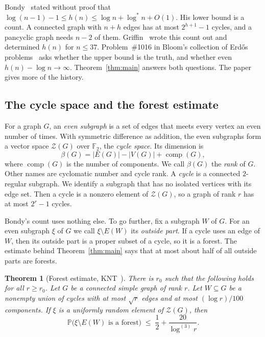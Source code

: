 \documentclass[11pt]{article}
\newtheorem{theorem}{Theorem}[section]
\theoremstyle{definition}
\theoremstyle{remark}
\newcommand{\Z}{\mathcal{Z}}
\newcommand{\PP}{\mathbb{P}}
\newcommand{\comp}{\operatorname{comp}}
\newcommand{\lgs}{\log^{*}}
\newcommand{\lgk}[1]{\log^{(#1)}}
\newcommand{\sm}{\setminus}
\begin{document}
Bondy~\cite{Bondy} stated without proof that $\log(n-1)-1\le h(n)\le\log n+\lgs n+O(1)$. His lower
bound is a count. A connected graph with $n+h$ edges has at most $2^{h+1}-1$ cycles, and a pancyclic
graph needs $n-2$ of them. Griffin~\cite{Griffin} wrote this count out and determined $h(n)$ for
$n\le37$. Problem~\#1016 in Bloom's collection of Erd\H{o}s problems~\cite{Bloom}
asks whether the upper bound is the truth, and whether even $h(n)-\log n\to\infty$.
Theorem~\ref{thm:main} answers both questions. The paper~\cite{KNT} gives more of the history.

\subsection{The cycle space and the forest estimate}

For a graph $G$, an \emph{even subgraph} is a set of edges that meets every vertex an even number of
times. With symmetric difference as addition, the even subgraphs form a vector space $\Z(G)$ over
$\mathbb{F}_2$, the \emph{cycle space}. Its dimension is
\[
  \beta(G)=|E(G)|-|V(G)|+\comp(G),
\]
where $\comp(G)$ is the number of components. We call $\beta(G)$ the \emph{rank} of $G$. Other names
are cyclomatic number and cycle rank. A \emph{cycle} is a connected $2$-regular subgraph. We
identify a subgraph that has no isolated vertices with its edge set. Then a cycle is a nonzero
element of $\Z(G)$, so a graph of rank $r$ has at most $2^{r}-1$ cycles.

Bondy's count uses nothing else. To go further, fix a subgraph $W$ of $G$. For an even subgraph
$\xi$ of $G$ we call $\xi\sm E(W)$ its \emph{outside part}. If a cycle uses an edge of $W$, then its
outside part is a proper subset of a cycle, so it is a forest. The estimate behind
Theorem~\ref{thm:main} says that at most about half of all outside parts are forests.

\begin{theorem}[Forest estimate, KNT~\cite{KNT}]\label{thm:forest}
There is $r_0$ such that the following holds for all $r\ge r_0$. Let $G$ be a connected simple graph
of rank $r$. Let $W\subseteq G$ be a nonempty union of cycles with at most $\sqrt r$ edges and at
most $(\log r)/100$ components. If $\xi$ is a uniformly random element of $\Z(G)$, then
\begin{equation}\label{eq:forest}
  \PP\bigl(\xi\sm E(W)\text{ is a forest}\bigr)\;\le\;\frac12+\frac{20}{\lgk{3}r}.
\end{equation}
\end{theorem}
\end{document}

